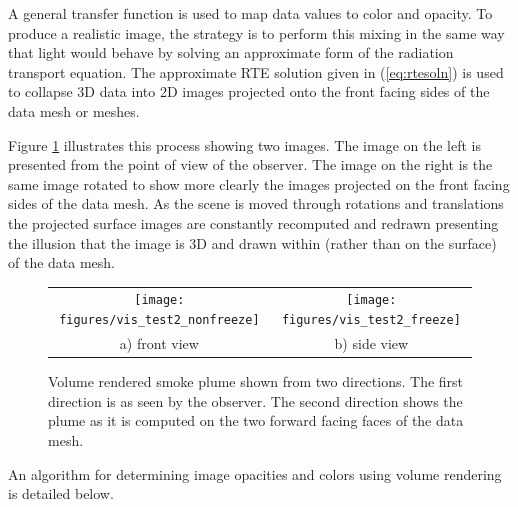 A general transfer function is used to map data values to color and opacity. To produce a realistic image, the strategy is to perform this mixing in the same way that light would behave by solving an approximate form of the radiation transport equation.  The approximate RTE solution given in (\ref{eq:rtesoln})  is used to collapse 3D data into 2D images projected onto the front facing sides of the data mesh or meshes.

Figure \ref{fig:volplume_example} illustrates this process showing two images.  The image on the left is presented from the point of view of the observer.  The image on the right is the same image rotated to show more clearly the images projected on the front facing sides of the data mesh.  As the scene is moved through rotations and translations the projected surface images are constantly recomputed and redrawn presenting the illusion that the image is 3D and drawn within (rather than on the surface) of the data mesh.

\begin{figure}[\figoptions]
\begin{center}
\begin{tabular}{cc}
\texttt{[image: figures/vis\_test2\_nonfreeze]}&
\texttt{[image: figures/vis\_test2\_freeze]}\\
a) front view&b) side view\\
\end{tabular}
\end{center}
\caption[Volume rendered smoke plume shown from two directions.]{Volume rendered smoke plume shown from two directions.
The first direction is as seen by the observer.  The second direction shows the plume as it is computed on the two forward facing faces of the data mesh.
}
\label{fig:volplume_example}
\end{figure}

An algorithm for determining image opacities and colors using volume rendering is detailed below.

